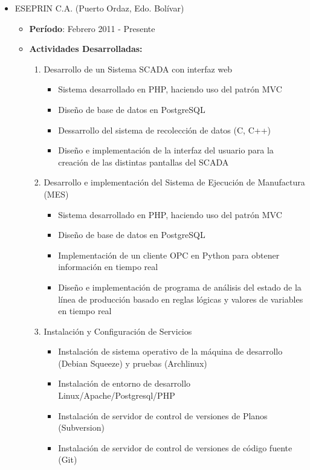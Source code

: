 \documentclass[letterpaper,12pt]{report}
\begin{document}
    \begin{itemize}

        \item{ESEPRIN C.A. (Puerto Ordaz, Edo. Bolívar)}
        \begin{itemize}
        \item{\textbf{Período}: Febrero 2011 - Presente}
        \item{\textbf{Actividades Desarrolladas:}}
            \begin{enumerate}
            \item Desarrollo de un Sistema SCADA con interfaz web
                \begin{itemize}
                \item Sistema desarrollado en PHP, haciendo uso del patrón MVC
                \item Diseño de base de datos en PostgreSQL
                \item Dessarrollo del sistema de recolección de datos (C, C++)
                \item Diseño e implementación de la interfaz del usuario para la creación de las distintas pantallas del SCADA
                \end{itemize}
            \item Desarrollo e implementación del Sistema de Ejecución de Manufactura (MES)
                \begin{itemize}
                \item Sistema desarrollado en PHP, haciendo uso del patrón MVC
                \item Diseño de base de datos en PostgreSQL
                \item Implementación de un cliente OPC en Python para obtener información en tiempo real
                \item Diseño e implementación de programa de análisis del estado de la línea de producción basado en reglas lógicas y valores de variables en tiempo real
                \end{itemize}
            \item Instalación y Configuración de Servicios
                \begin{itemize}
                \item Instalación de sistema operativo de la máquina de desarrollo (Debian Squeeze) y pruebas (Archlinux)
                \item Instalación de entorno de desarrollo Linux/Apache/Postgresql/PHP
                \item Instalación de servidor de control de versiones de Planos (Subversion)
                \item Instalación de servidor de control de versiones de código fuente (Git)
                \end{itemize}
            \end{enumerate}
        \end{itemize}
    

\end{itemize}
\end{document}
